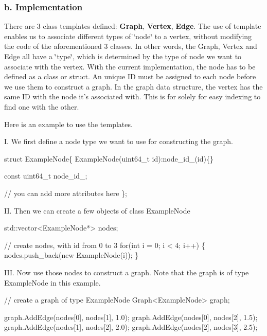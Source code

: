 \subsubsection*{b. Implementation}

There are 3 class templates defined\-: {\bfseries Graph}, {\bfseries Vertex}, {\bfseries Edge}. The use of template enables us to associate different types of \char`\"{}node\char`\"{} to a vertex, without modifying the code of the aforementioned 3 classes. In other words, the Graph, Vertex and Edge all have a \char`\"{}type\char`\"{}, which is determined by the type of node we want to associate with the vertex. With the current implementation, the node has to be defined as a class or struct. An unique I\-D must be assigned to each node before we use them to construct a graph. In the graph data structure, the vertex has the same I\-D with the node it's associated with. This is for solely for easy indexing to find one with the other.

Here is an example to use the templates.

I. We first define a node type we want to use for constructing the graph.


\begin{DoxyCode}
\textcolor{keyword}{struct }ExampleNode\{
    ExampleNode(uint64\_t \textcolor{keywordtype}{id}):node\_id\_(id)\{\}

    \textcolor{keyword}{const} uint64\_t node\_id\_;

    \textcolor{comment}{// you can add more attributes here}
\};
\end{DoxyCode}


I\-I. Then we can create a few objects of class Example\-Node


\begin{DoxyCode}
std::vector<ExampleNode*> nodes;

\textcolor{comment}{// create nodes, with id from 0 to 3}
\textcolor{keywordflow}{for}(\textcolor{keywordtype}{int} i = 0; i < 4; i++) \{
    nodes.push\_back(\textcolor{keyword}{new} ExampleNode(i));
\}
\end{DoxyCode}


I\-I\-I. Now use those nodes to construct a graph. Note that the graph is of type Example\-Node in this example.


\begin{DoxyCode}
\textcolor{comment}{// create a graph of type ExampleNode}
Graph<ExampleNode> graph;

graph.AddEdge(nodes[0], nodes[1], 1.0);
graph.AddEdge(nodes[0], nodes[2], 1.5);
graph.AddEdge(nodes[1], nodes[2], 2.0);
graph.AddEdge(nodes[2], nodes[3], 2.5);
\end{DoxyCode}


